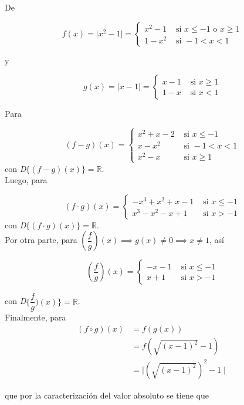 \documentclass[a4paper,12pt]{report}
\begin{document}
\begin{enumerate}
De

\[
f(x) = \mid x^2 -1 \mid = 
	\begin{cases}	
		x^2-1 & \text{ si } x \leq -1 \text{ o } x\geq 1 \\
		1-x^2 & \text{ si } -1 < x < 1
	\end{cases}
\]

y

\[
g(x) = \mid x -1 \mid = 
	\begin{cases}	
		x-1 & \text{ si } x \geq 1 \\
		1-x & \text{ si } x < 1
	\end{cases}
\]

Para

\[
(f-g)(x) = 
	\begin{cases}	
		x^2 +x -2 & \text{ si } x \leq -1 \\
		x - x^2 & \text{ si } -1 < x < 1 \\
		x^2 - x & \text{ si } x \geq 1
	\end{cases}
\]
con \emph{D}$\{ (f-g)(x) \} = \mathds{R} $.\\

Luego, para

\[
(f \cdot g)(x) = 
	\begin{cases}	
		-x^3 + x^2 +x -1 & \text{ si } x \leq -1 \\
		x^3 - x^2 - x + 1 & \text{ si } x > -1
	\end{cases}
\]
con \emph{D}$\{ (f \cdot g)(x) \} = \mathds{R} $.\\

Por otra parte, para $(\dfrac{f}{g})(x) \implies g(x) \neq 0 \implies x \neq 1$, así

\[
(\dfrac{f}{g})(x) = 
	\begin{cases}	
		-x -1 & \text{ si } x \leq -1 \\
		x + 1 & \text{ si } x > -1
	\end{cases}
\]

con \emph{D}$\{ \dfrac{f}{g})(x) \} = \mathds{R} $.\\

Finalmente, para 
\begin{align*}
(f \circ g)(x)
& = f(g(x))
\\ & = f(\sqrt{(x-1)^2} -1)
\\ &  = \mid (\sqrt{(x-1)^2})^2 -1\mid
\end{align*}

que por la caracterización del valor absoluto se tiene que\\


\end{enumerate}
\end{document}
